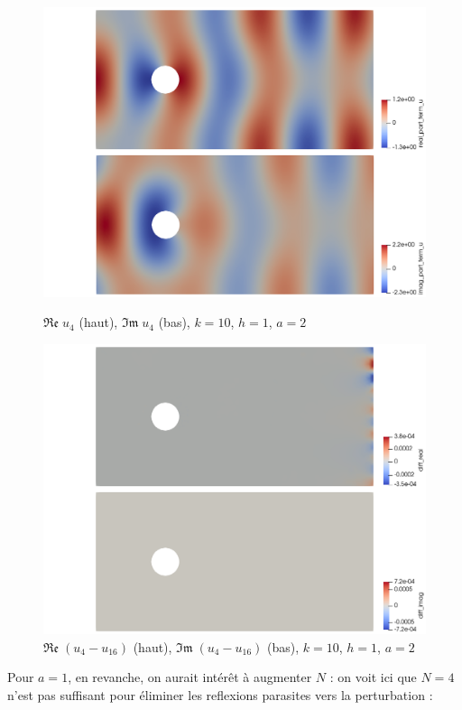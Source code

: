 \documentclass{article}
\begin{document}
\begin{figure}[h!]
\begin{minipage}[b]{.4\textwidth}
\centering
    \includegraphics[trim = {5cm 0cm 0cm 0cm}, clip, scale=0.25]{sc_DtN_2_4.png}
    \caption{$\mathfrak{Re }\; u_4$ (haut), $\mathfrak{Im }\; u_4$ (bas), $k=10$, $h=1$,  $a=2$}
\end{minipage}
\hfill
\begin{minipage}[b]{.45\textwidth}
 \centering
    \includegraphics[trim = {5cm 0cm 0cm 0cm}, clip, scale=0.25]{sc_DtN_2_diff_4_16.png}
    \caption{$\mathfrak{Re }\; (u_{4}-u_{16})$ (haut), $\mathfrak{Im }\; (u_{4}-u_{16})$ (bas), $k=10$, $h=1$,  $a=2$}
\end{minipage}
\end{figure}
\newpage
Pour $a=1$, en revanche, on aurait intérêt à augmenter $N$ : on voit ici que $N=4$ n'est pas suffisant pour éliminer les reflexions parasites vers la perturbation : 
\end{document}
